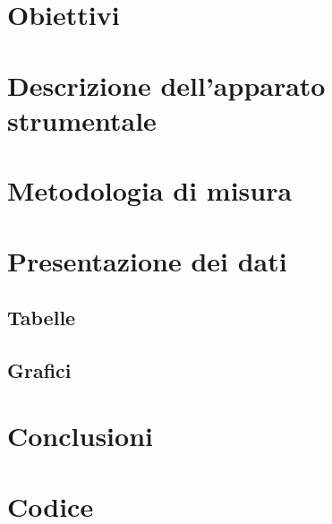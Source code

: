 \documentclass[12pt,a4paper]{article} %
\begin{document}
\maketitle %

\section{Obiettivi}
	

\section{Descrizione dell'apparato strumentale}
	

\section{Metodologia di misura}
	
	\clearpage
	
\section{Presentazione dei dati}			
	\subsection{Tabelle}
	
	
	\clearpage
	\subsection{Grafici}
	
		
\section{Conclusioni}
	
	
\section{Codice}	
	
	
\end{document}
